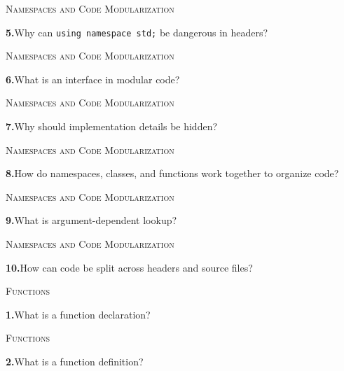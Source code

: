 \documentclass[11pt,a4paper]{article}
\newenvironment{questionblock}{%
  \begin{minipage}[t][0.455\textheight][t]{\textwidth}%
  \raggedright\small
}{%
  \vfill
  \end{minipage}%
}
\newcommand{\sectionlabel}[1]{\textsc{#1}\par\vspace{0.35em}}
\newcommand{\questionnumber}[1]{\textbf{#1.}\enspace}
\begin{document}
\vspace*{0.04\textheight}
\begin{questionblock}
\sectionlabel{Namespaces and Code Modularization}
\questionnumber{5}Why can \verb|using namespace std;| be dangerous in headers?\par
\end{questionblock}
\newpage
\begin{questionblock}
\sectionlabel{Namespaces and Code Modularization}
\questionnumber{6}What is an interface in modular code?\par
\end{questionblock}
\vspace*{0.04\textheight}
\begin{questionblock}
\sectionlabel{Namespaces and Code Modularization}
\questionnumber{7}Why should implementation details be hidden?\par
\end{questionblock}
\newpage
\begin{questionblock}
\sectionlabel{Namespaces and Code Modularization}
\questionnumber{8}How do namespaces, classes, and functions work together to organize code?\par
\end{questionblock}
\vspace*{0.04\textheight}
\begin{questionblock}
\sectionlabel{Namespaces and Code Modularization}
\questionnumber{9}What is argument-dependent lookup?\par
\end{questionblock}
\newpage
\begin{questionblock}
\sectionlabel{Namespaces and Code Modularization}
\questionnumber{10}How can code be split across headers and source files?\par

\end{questionblock}
\vspace*{0.04\textheight}
\begin{questionblock}
\sectionlabel{Functions}
\questionnumber{1}What is a function declaration?\par
\end{questionblock}
\newpage
\begin{questionblock}
\sectionlabel{Functions}
\questionnumber{2}What is a function definition?\par
\end{questionblock}
\vspace*{0.04\textheight}
\end{document}
